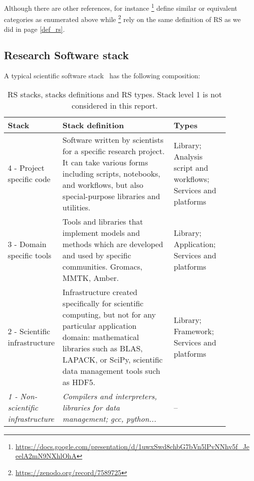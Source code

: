 Although there are other references, for instance \footnote{\url{https://docs.google.com/presentation/d/1uwxSwd8chbG7bVn5lPvNNhv5f_JeeelA2mN9NXhlOhA}} define similar or equivalent categories as enumerated above while \footnote{\url{https://zenodo.org/record/7589725}} rely on the same definition of RS as we did in page \ref{def_rs}.

\subsection{Research Software stack}



A typical scientific software stack~\cite{hinsen2019} has the following composition:

\begin{center}
\begin{table}
    \label{tab:rs_stacks}
    \small
    \begin{tabular}[t]{|p{0.15\linewidth}|p{0.5\linewidth}|p{0.25\linewidth}|} \hline

    \textbf{Stack} & \textbf{Stack definition} & \textbf{Types} \\ \hline \hline
    4 - Project specific code &
    Software written by scientists for a specific research project. It can take various forms including scripts, notebooks, and workflows, but also special-purpose libraries and utilities. &
    Library; Analysis script and workflows; Services and platforms \\ \hline

    3 - Domain specific tools &
    Tools and libraries that implement models and methods which are developed and used by specific communities. Gromacs, MMTK, Amber. &
    Library; Application; Services and platforms \\ \hline

    2 - Scientific infrastructure &
    Infrastructure created specifically for scientific computing, but not for any particular application domain: mathematical libraries such as BLAS, LAPACK, or SciPy, scientific data management tools such as HDF5. &
    Library; Framework; Services and platforms\\ \hline

    \it{1 - Non-scientific infrastructure} &
    \it{Compilers and interpreters, libraries for data management; gcc, python...} &
    -- \\ \hline

    \end{tabular}
    \caption{RS stacks, stacks definitions and RS types. Stack level 1 is not considered in this report.}
\end{table}
\end{center}


